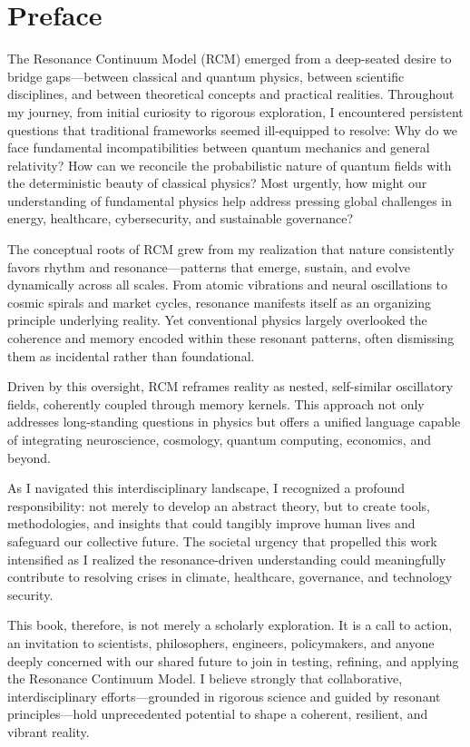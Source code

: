 \chapter{Preface}


The Resonance Continuum Model (RCM) emerged from a deep-seated desire to bridge gaps—between classical and quantum physics, between scientific disciplines, and between theoretical concepts and practical realities. Throughout my journey, from initial curiosity to rigorous exploration, I encountered persistent questions that traditional frameworks seemed ill-equipped to resolve: Why do we face fundamental incompatibilities between quantum mechanics and general relativity? How can we reconcile the probabilistic nature of quantum fields with the deterministic beauty of classical physics? Most urgently, how might our understanding of fundamental physics help address pressing global challenges in energy, healthcare, cybersecurity, and sustainable governance?

The conceptual roots of RCM grew from my realization that nature consistently favors rhythm and resonance—patterns that emerge, sustain, and evolve dynamically across all scales. From atomic vibrations and neural oscillations to cosmic spirals and market cycles, resonance manifests itself as an organizing principle underlying reality. Yet conventional physics largely overlooked the coherence and memory encoded within these resonant patterns, often dismissing them as incidental rather than foundational.

Driven by this oversight, RCM reframes reality as nested, self-similar oscillatory fields, coherently coupled through memory kernels. This approach not only addresses long-standing questions in physics but offers a unified language capable of integrating neuroscience, cosmology, quantum computing, economics, and beyond.

As I navigated this interdisciplinary landscape, I recognized a profound responsibility: not merely to develop an abstract theory, but to create tools, methodologies, and insights that could tangibly improve human lives and safeguard our collective future. The societal urgency that propelled this work intensified as I realized the resonance-driven understanding could meaningfully contribute to resolving crises in climate, healthcare, governance, and technology security.

This book, therefore, is not merely a scholarly exploration. It is a call to action, an invitation to scientists, philosophers, engineers, policymakers, and anyone deeply concerned with our shared future to join in testing, refining, and applying the Resonance Continuum Model. I believe strongly that collaborative, interdisciplinary efforts—grounded in rigorous science and guided by resonant principles—hold unprecedented potential to shape a coherent, resilient, and vibrant reality.

